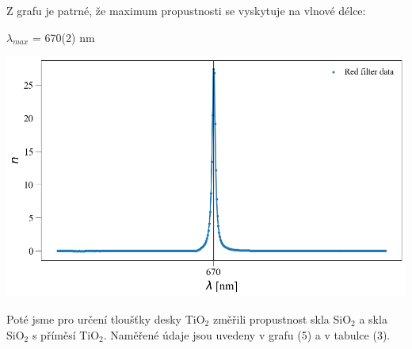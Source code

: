 \documentclass[a4paper,11pt]{article}
\begin{document}
\begin{minipage}[t]{0.5\textwidth}
                \par Z grafu je patrné, že maximum propustnosti se vyskytuje na vlnové délce: 
                \begin{center}
                    $\lambda_{max}$ = 670(2) nm
                \end{center}
                \vspace{10pt}   
                \par \centering
                \includegraphics[scale=0.35]{red}
                \captionsetup{justification=centering, font=footnotesize}
                \label{fig:red}
                \vspace{10pt}
                \raggedright
                Poté jsme pro určení tloušťky desky TiO$_2$ změřili propustnost skla SiO$_2$ a skla SiO$_2$ s příměsí TiO$_2$. Naměřené údaje jsou uvedeny v grafu (5) a v tabulce (3).
    \end{minipage}
\newpage
\end{document}
